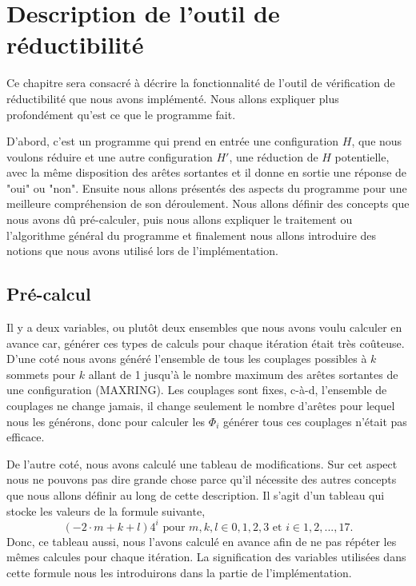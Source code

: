 \documentclass[10pt,a4paper]{article}
\begin{document}
\section{Description de l'outil de réductibilité}
\label{chap:Des}

Ce chapitre sera consacré à décrire la fonctionnalité de l'outil de vérification de réductibilité que nous avons implémenté. Nous allons expliquer plus profondément qu'est ce que le programme fait.

D'abord, c'est un programme qui prend en entrée une configuration $H$, que nous voulons réduire et une autre configuration $H'$, une réduction de $H$ potentielle, avec la même disposition des arêtes sortantes et il donne en sortie une réponse de "oui" ou "non". Ensuite nous allons présentés des aspects du programme pour une meilleure compréhension de son déroulement. Nous allons définir des concepts que nous avons dû pré-calculer, puis nous allons expliquer le traitement ou l'algorithme général du programme et finalement nous allons introduire des notions que nous avons utilisé lors de l'implémentation.

\subsection{Pré-calcul}

Il y a deux variables, ou plutôt deux ensembles que nous avons voulu calculer en avance car, générer ces types de calculs pour chaque itération était très coûteuse. D'une coté nous avons généré l'ensemble de tous les couplages possibles à $k$ sommets pour $k$ allant de 1 jusqu'à le nombre maximum des arêtes sortantes de une configuration (MAXRING). Les couplages sont fixes, c-à-d, l'ensemble de couplages ne change jamais, il change seulement le nombre d'arêtes pour lequel nous les générons, donc pour calculer les $\Phi_i$ générer tous ces couplages n'était pas efficace. 

De l'autre coté, nous avons calculé une tableau de modifications. Sur cet aspect nous ne pouvons pas dire grande chose parce qu'il nécessite des autres concepts que nous allons définir au long de cette description. Il s'agit d'un tableau qui stocke les valeurs de la formule suivante,
$$
(-2\cdot m + k + l)4^i \textrm{  pour $m, k, l \in {0,1,2,3}$ et $i \in {1,2,...,17}$}.
$$
Donc, ce tableau aussi, nous l'avons calculé en avance afin de ne pas répéter les mêmes calcules pour chaque itération. La signification des variables utilisées dans cette formule nous les introduirons dans la partie de l'implémentation.
\end{document}

